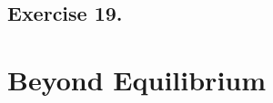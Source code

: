 \documentclass[a4paper,UTF8,fleqn]{book}
\numberwithin{equation}{section}
\begin{document}
% 
% 
% 
% 
% 
% 
% 
% 
% 
\section{Exercise 19.}


\chapter{Beyond Equilibrium}
\end{document}

